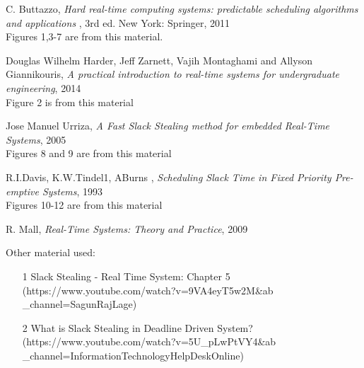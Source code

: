 \documentclass[conference]{IEEEtran}
\begin{document}
\begin{thebibliography}{9}
	C. Buttazzo,
	\textit{Hard real-time computing systems: predictable scheduling algorithms and applications} 
	, 3rd ed. New York: Springer, 2011 \\
	Figures 1,3-7 are from this material.
	
	Douglas Wilhelm Harder, Jeff Zarnett,
	Vajih Montaghami and Allyson Giannikouris,
	\textit{A practical introduction
		to real-time systems
		for undergraduate engineering}, 2014 \\ Figure 2 is from this material
	\hfill
	
	Jose Manuel Urriza,
	\textit{A Fast Slack Stealing method for embedded Real-Time Systems}, 2005 \\
	Figures 8 and 9 are from this material
	\hfill
	
	R.I.Davis, K.W.Tindel1, ABurns ,
	\textit{Scheduling Slack Time in Fixed Priority Pre-emptive Systems}, 1993 \\
	Figures 10-12 are from this material
	\hfill
	
	R. Mall,
	\textit{Real-Time Systems: Theory and Practice}, 2009
	\hfill
	
	Other material used:
	\begin{itemize}
		\item [1] Slack Stealing - Real Time System: Chapter 5 (https://www.youtube.com/watch?v=9VA4eyT5w2M\&ab
		\_channel=SagunRajLage)
		\item [2] What is Slack Stealing in Deadline Driven System? (https://www.youtube.com/watch?v=5U\_pLwPtVY4\&ab
		\_channel=InformationTechnologyHelpDeskOnline)
				
	\end{itemize}
	
\end{thebibliography}
\end{document}
